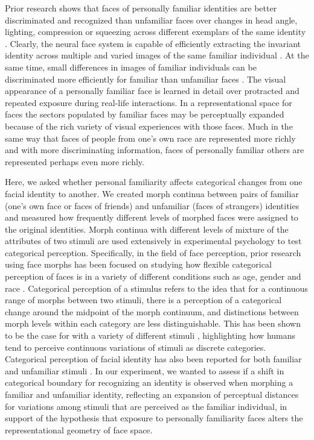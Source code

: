 \documentclass[10pt,letterpaper]{article}
\begin{document}
Prior research shows that faces of personally familiar identities are better discriminated and recognized than unfamiliar faces over changes in head angle, lighting, compression or squeezing across different exemplars of the same identity \cite{sinha2006face, harmon1973masking, hole2002effects, gilad2018recognizing, di2018idiosyncratic}. Clearly, the neural face system is capable of efficiently extracting the invariant identity across multiple and varied images of the same familiar individual \cite{guntupalli2016disentangling, guntupalli2017reading}.  At the same time, small differences in images of familiar individuals can be discriminated more efficiently for familiar than unfamiliar faces \cite{visconti2014facilitated, chauhan2017social, ramon2018familiarity, di2018idiosyncratic, di2017familiarity, di2017neural}.  
The visual appearance of a personally familiar face is learned in detail over protracted and repeated exposure during real-life interactions. In a representational space for faces the sectors populated by familiar faces may be perceptually expanded because of the rich variety of visual experiences with those faces.  Much in the same way that faces of people from one’s own race are represented more richly and with more discriminating information, faces of personally familiar others are represented perhaps even more richly. 

Here, we asked whether personal familiarity affects categorical changes from one facial identity to another. We created morph continua between pairs of familiar (one’s own face or faces of friends) and unfamiliar (faces of strangers) identities and measured how frequently different levels of morphed faces were assigned to the original identities. Morph continua with different levels of mixture of the attributes of two stimuli are used extensively in experimental psychology to test categorical perception. Specifically, in the field of face perception, prior research using face morphs has been focused on studying how flexible categorical perception of faces is in a variety of different conditions such as age, gender and race \cite{angeli2008face, webster2004adaptation, rhodes2003fitting}. Categorical perception of a stimulus refers to the idea that for a continuous range of morphs between two stimuli, there is a perception of a categorical change around the midpoint of the morph continuum, and distinctions between morph levels within each category are less distinguishable. This has been shown to be the case for with a variety of different stimuli \cite{harnad1987psychophysical}, highlighting how humans tend to perceive continuous variations of stimuli as discrete categories. Categorical perception of facial identity has also been reported for both familiar and unfamiliar stimuli \cite{beale1995categorical, rotshtein2005morphing, kaufmann2004expression, kikutani2008s, ramon2016real}. In our experiment, we wanted to assess if a shift in categorical boundary for recognizing an identity is observed when morphing a familiar and unfamiliar identity, reflecting an expansion of perceptual distances for variations among stimuli that are perceived as the familiar individual, in support of the hypothesis that exposure to personally familiarity faces alters the representational geometry of face space. 
\end{document}
